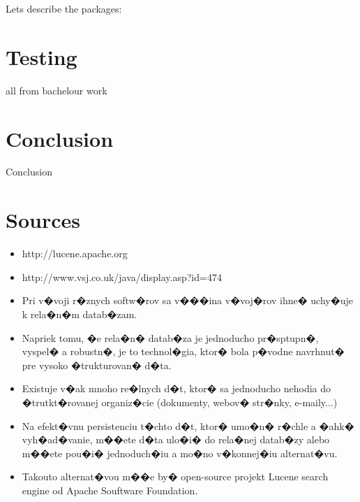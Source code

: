 \documentclass[11pt,a4paper]{article}
\begin{document}
Lets describe the packages:





\newpage
\section{Testing}

all from bachelour work


\newpage
\section{Conclusion}

Conclusion


\newpage
\section{Sources}

\begin{itemize}
\item http://lucene.apache.org
\item http://www.vsj.co.uk/java/display.asp?id=474
\end{itemize}


\begin{itemize}
\item Pri v�voji r�znych softw�rov sa v���ina v�voj�rov ihne� uchy�uje k rela�n�m datab�zam.
\item Napriek tomu, �e rela�n� datab�za je jednoducho pr�sptupn�, vyspel� a robustn�, je to technol�gia, ktor� bola p�vodne navrhnut�
pre vysoko �trukturovan� d�ta.
\item Existuje v�ak mnoho re�lnych d�t, ktor� sa jednoducho nehodia do �trutkt�rovanej organiz�cie (dokumenty, webov� str�nky, e-maily...)
\item Na efekt�vnu persistenciu t�chto d�t, ktor� umo�n� r�chle a �ahk� vyh�ad�vanie, m��ete d�ta ulo�i� do rela�nej datab�zy alebo m��ete pou�i� jednoduch�iu a mo�no v�konnej�iu alternat�vu.
\item Takouto alternat�vou m��e by� open-source projekt Lucene search engine od Apache Souftware Foundation.
\end{itemize}
\end{document}
